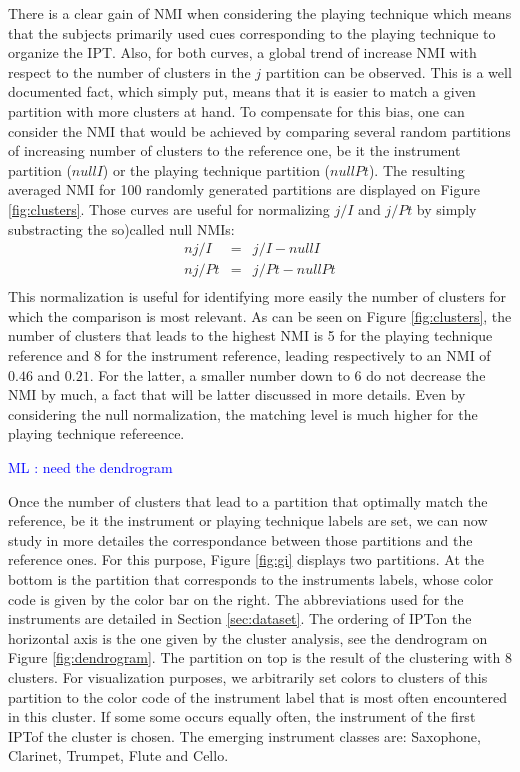 \documentclass{article}
\newcommand{\ipt}{IPT}
\newcommand{\ml}[1]{\textcolor{blue}{ML : #1}}
\begin{document}
There is a clear gain of NMI when considering the playing technique which means that the subjects primarily used cues corresponding to the playing technique to organize the \ipt. Also, for both curves, a global trend of increase NMI with respect to the number of clusters in the $j$ partition can be observed. This is a well documented fact, which simply put, means that it is easier to match a given partition with more clusters at hand. To compensate for this bias, one can consider the NMI that would be achieved by comparing several random partitions of increasing number of clusters to the reference one, be it the instrument partition ($nullI$) or the playing technique partition ($nullPt$). The resulting averaged NMI for 100 randomly generated partitions are displayed on Figure \ref{fig:clusters}. Those curves are useful for normalizing $j/I$ and $j/Pt$ by simply substracting the so)called null NMIs:
\begin{eqnarray}
  nj/I &=& j/I - nullI  \\
  nj/Pt &=& j/Pt - nullPt  \\
\end{eqnarray}
This normalization is useful for identifying more easily the number of clusters for which the comparison is most relevant. As can be seen on Figure \ref{fig:clusters}, the number of clusters that leads to the highest NMI is 5 for the playing technique reference and 8 for the instrument reference, leading respectively to an NMI of $0.46$ and $0.21$. For the latter, a smaller number down to 6 do not decrease the NMI by much, a fact that will be latter discussed in more details. Even by considering the null normalization, the matching level is much higher for the playing technique refereence.

\ml{need the dendrogram}

Once the number of clusters that lead to a partition that optimally match the reference, be it the instrument or playing technique labels are set, we can now study in more detailes the correspondance between those partitions and the reference ones. For this purpose, Figure \ref{fig:gi} displays two partitions. At the bottom is the partition that corresponds to the instruments labels, whose color code is given by the color bar on the right. The abbreviations used for the instruments are detailed in Section \ref{sec:dataset}. The ordering of \ipt on the horizontal axis is the one given by the cluster analysis, see the dendrogram on Figure \ref{fig:dendrogram}. The partition on top is the result of the clustering with 8 clusters. For visualization purposes, we arbitrarily set colors to clusters of this partition to the color code of the instrument label that is most often encountered in this cluster. If some some occurs equally often, the instrument of the first \ipt of the cluster is chosen. The emerging instrument classes are: Saxophone, Clarinet, Trumpet, Flute and Cello.
\end{document}
